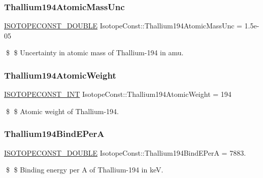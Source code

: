 \subsubsection{\texorpdfstring{Thallium194\+Atomic\+Mass\+Unc}{Thallium194AtomicMassUnc}}
{\footnotesize\ttfamily \mbox{\hyperlink{group___isotope_const-_macros_ga8f45a7272ce02c0b4c65c44636ed719a}{I\+S\+O\+T\+O\+P\+E\+C\+O\+N\+S\+T\+\_\+\+D\+O\+U\+B\+LE}} Isotope\+Const\+::\+Thallium194\+Atomic\+Mass\+Unc = 1.\+5e-\/05}

\$ \$ Uncertainty in atomic mass of Thallium-\/194 in amu. \mbox{\label{group___isotope_const-_thallium-_tl194_ga866cf57a43d851f92523ac2be1e6e445}} 
\subsubsection{\texorpdfstring{Thallium194\+Atomic\+Weight}{Thallium194AtomicWeight}}
{\footnotesize\ttfamily \mbox{\hyperlink{group___isotope_const-_macros_ga5f18360b3e99483a35c32d789e62621c}{I\+S\+O\+T\+O\+P\+E\+C\+O\+N\+S\+T\+\_\+\+I\+NT}} Isotope\+Const\+::\+Thallium194\+Atomic\+Weight = 194}

\$ \$ Atomic weight of Thallium-\/194. \mbox{\label{group___isotope_const-_thallium-_tl194_ga30fb6a5a714c3d6cc30a66092917921e}} 
\subsubsection{\texorpdfstring{Thallium194\+Bind\+E\+PerA}{Thallium194BindEPerA}}
{\footnotesize\ttfamily \mbox{\hyperlink{group___isotope_const-_macros_ga8f45a7272ce02c0b4c65c44636ed719a}{I\+S\+O\+T\+O\+P\+E\+C\+O\+N\+S\+T\+\_\+\+D\+O\+U\+B\+LE}} Isotope\+Const\+::\+Thallium194\+Bind\+E\+PerA = 7883.}

\$ \$ Binding energy per A of Thallium-\/194 in keV. \mbox{\label{group___isotope_const-_thallium-_tl194_ga5881c0fb8a5f4da31260bf826301392c}} 
